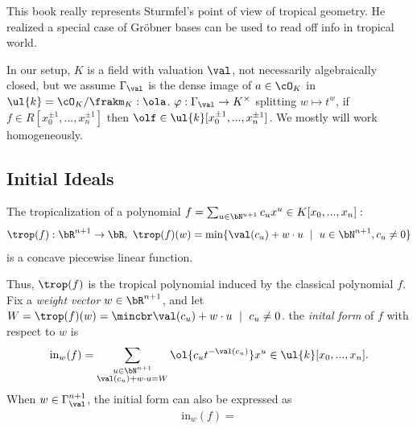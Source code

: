    This book really represents Sturmfel's point of view of tropical geometry. He realized a special case of Gr\"obner bases can be used to read off info in tropical world.

    In our setup, $K$ is a field with valuation $\val$, not necessarily algebraically closed, but we assume $\Gamma_{\val}$ is the dense image of $a\in \cO_K$ in $\ul{k} = \cO_K/\frakm_K: \ola$. $\varphi:\Gamma_{\val} \to K^\times$ splitting $w\mapsto t^w$, if $f \in R[x^{\pm 1}_0,...,x^{\pm 1}_n]$ then $\olf \in \ul{k}[x^{\pm 1}_0,...,x^{\pm 1}_n]$. We mostly will work homogeneously.

    \subsection{Initial Ideals}

    The tropicalization of a polynomial $f = \sum_{u\in \bN^{u+1}} c_ux^u \in K[x_0,...,x_n]:$
    \begin{align*}
      \trop(f):\bR^{n+1}\to \bR, ~ \trop(f)(w) = \min\{\val(c_u) + w\cdot u ~\mid~ u\in \bN^{n+1}, c_u \neq 0\}
    \end{align*}
    is a concave piecewise linear function.

    Thus, $\trop(f)$ is the tropical polynomial induced by the classical polynomial $f$. Fix a \emph{weight vector} $w \in \bR^{n+1}$, and let $W = \trop(f)(w) = \mincbr\val(c_u) + w\cdot u ~\mid~ c_u \neq 0$. the \emph{inital form} of $f$ with respect to $w$ is
    \begin{align*}
      \text{in}_w(f) = \sum_{\substack{u \in \bN^{n+1}\\ \val(c_u) + w\cdot u = W}} \ol{c_u t^{-\val(c_u)}} x^u \in \ul{k}[x_0,...,x_n].
    \end{align*}
    When $w \in \Gamma_{\val}^{n+1}$, the initial form can also be expressed as
    \begin{align*}
      \text{in}_w(f) = 
    \end{align*}


\printbibliography

